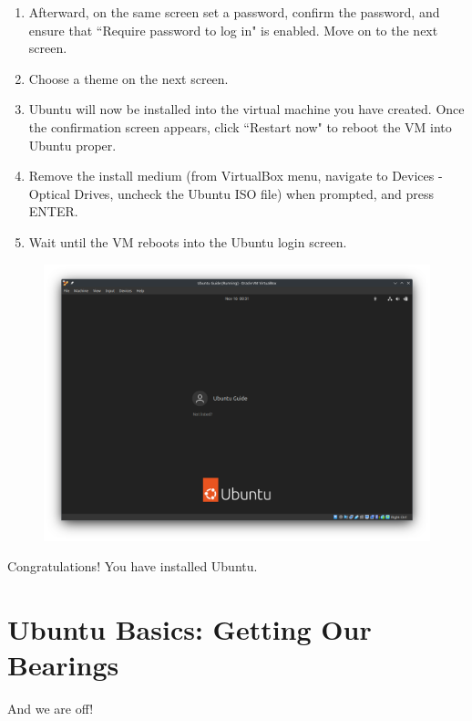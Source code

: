 \documentclass[12pt]{article}
\begin{document}
\begin{enumerate}
    \item Afterward, on the same screen set a password, confirm the password, and ensure that ``Require password to log in" is enabled. Move on to the next screen.
    \item Choose a theme on the next screen.
    \item Ubuntu will now be installed into the virtual machine you have created. Once the confirmation screen appears, click ``Restart now" to reboot the VM into Ubuntu proper.
    \item Remove the install medium (from VirtualBox menu, navigate to Devices -\> Optical Drives, uncheck the Ubuntu ISO file) when prompted, and press ENTER.
    \item Wait until the VM reboots into the Ubuntu login screen.
\end{enumerate}

\begin{figure}[htp]
    \centering
    \includegraphics[width=\textwidth]{1-14.png}
\end{figure}

Congratulations! You have installed Ubuntu.

\pagebreak
\section{Ubuntu Basics: Getting Our Bearings}

And we are off!
\end{document}
